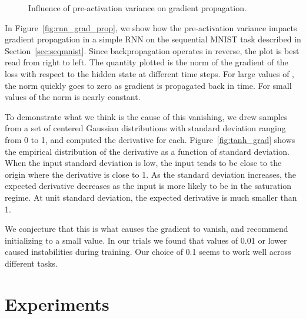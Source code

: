 \documentclass{article} \pdfoutput=1 \usepackage[utf8]{inputenc}
\begin{document}
\begin{figure}[!ht]
  \center {}\hspace{2mm}
  \caption{
Influence of pre-activation variance on gradient propagation.
}
  \label{fig:variance}
\end{figure}

In Figure~\ref{fig:rnn_grad_prop}, we show how the pre-activation variance
impacts gradient propagation in a simple RNN on the sequential MNIST task
described in Section~\ref{sec:seqmnist}.  Since backpropagation operates in
reverse, the plot is best read from right to left.  The quantity plotted is the
norm of the gradient of the loss with respect to the hidden state at different
time steps.  For large values of , the norm quickly goes to zero as
gradient is propagated back in time.  For small values of  the norm is
nearly constant.

To demonstrate what we think is the cause of this vanishing, we drew samples
 from a set of centered Gaussian distributions with standard deviation
ranging from 0 to 1, and computed the derivative  for each.  Figure~\ref{fig:tanh_grad} shows the empirical
distribution of the derivative as a function of standard deviation.  When the
input standard deviation is low, the input tends to be close to the origin
where the derivative is close to 1.  As the standard deviation increases, the
expected derivative decreases as the input is more likely to be in the
saturation regime.  At unit standard deviation, the expected derivative is much
smaller than 1.

We conjecture that this is what causes the gradient to vanish, and recommend
initializing  to a small value.  In our trials we found that values of
0.01 or lower caused instabilities during training.  Our choice of 0.1 seems to
work well across different tasks.

\section{Experiments}
\label{sec:experiments}
\end{document}
